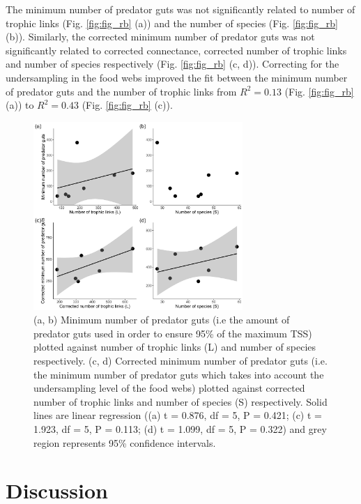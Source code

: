 \documentclass{article}
\begin{document}
The minimum number of predator guts was not significantly related to
number of trophic links (Fig. \ref{fig:fig_rb} (a)) and the number of
species (Fig. \ref{fig:fig_rb} (b)). Similarly, the corrected minimum
number of predator guts was not significantly related to corrected
connectance, corrected number of trophic links and number of species
respectively (Fig. \ref{fig:fig_rb} (c, d)). Correcting for the
undersampling in the food webs improved the fit between the minimum
number of predator guts and the number of trophic links from
\(R^2 = 0.13\) (Fig. \ref{fig:fig_rb} (a)) to \(R^2 = 0.43\) (Fig.
\ref{fig:fig_rb} (c)).

\begin{figure}

{\centering \includegraphics[width=300px]{../../results/misc/plot_n_min_gut_vs_SL} 

}

\caption{\label{fig:fig_rb} (a, b) Minimum number of predator guts (i.e the amount of predator guts used in order to ensure 95\% of the maximum TSS) plotted against number of trophic links (L) and number of species respectively. (c, d) Corrected minimum number of predator guts (i.e. the minimum number of predator guts which takes into account the undersampling level of the food webs) plotted against corrected number of trophic links and number of species (S) respectively. Solid lines are linear regression ((a) t = 0.876, df = 5, P = 0.421; (c) t = 1.923, df = 5, P = 0.113; (d) t = 1.099, df = 5, P = 0.322) and grey region represents 95\% confidence intervals.}\label{fig:unnamed-chunk-4}
\end{figure}

\hypertarget{discussion}{%
\section{Discussion}\label{discussion}}
\end{document}
